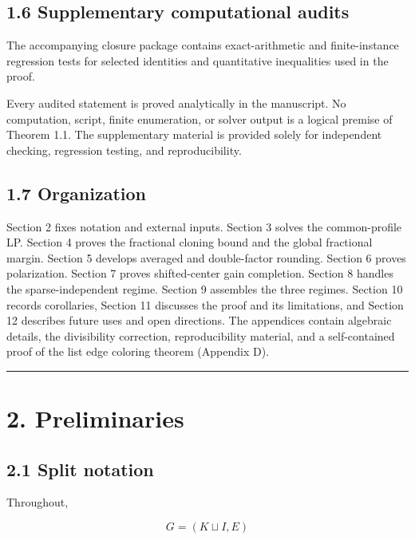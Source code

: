 \documentclass[
  11pt,
]{article}
\begin{document}
\subsection{1.6 Supplementary computational
audits}\label{supplementary-computational-audits}

The accompanying closure package contains exact-arithmetic and
finite-instance regression tests for selected identities and
quantitative inequalities used in the proof.

Every audited statement is proved analytically in the manuscript. No
computation, script, finite enumeration, or solver output is a logical
premise of Theorem 1.1. The supplementary material is provided solely
for independent checking, regression testing, and reproducibility.

\subsection{1.7 Organization}\label{organization}

Section 2 fixes notation and external inputs. Section 3 solves the
common-profile LP. Section 4 proves the fractional cloning bound and the
global fractional margin. Section 5 develops averaged and double-factor
rounding. Section 6 proves polarization. Section 7 proves shifted-center
gain completion. Section 8 handles the sparse-independent regime.
Section 9 assembles the three regimes. Section 10 records corollaries,
Section 11 discusses the proof and its limitations, and Section 12
describes future uses and open directions. The appendices contain
algebraic details, the divisibility correction, reproducibility
material, and a self-contained proof of the list edge coloring theorem
(Appendix D).

\begin{center}\rule{0.5\linewidth}{0.5pt}\end{center}

\section{2. Preliminaries}\label{preliminaries}

\subsection{2.1 Split notation}\label{split-notation}

Throughout,

\[
G=(K\sqcup I,E)
\]
\end{document}
